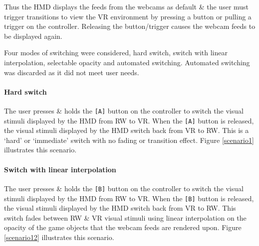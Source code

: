 \documentclass[conference]{acmsiggraph}
\begin{document}

Thus the HMD displays the feeds from the webcams as default \& the user must trigger transitions to view the VR environment by pressing a button or pulling a trigger on the controller. Releasing the button/trigger causes the webcam feeds to be displayed again.

Four modes of switching were considered, hard switch, switch with linear interpolation, selectable opacity and automated switching. Automated switching was discarded as it did not meet user needs. 

\paragraph{Hard switch}
\label{sub-hardswitch}
The user presses \& holds the \texttt{[A]} button on the controller to switch the visual stimuli displayed by the HMD from RW to VR. When the \texttt{[A]} button is released, the visual stimuli displayed by the HMD switch back from VR to RW. This is a `hard' or `immediate' switch with no fading or transition effect. Figure \ref{scenario1} illustrates this scenario.

\paragraph{Switch with linear interpolation}
The user presses \& holds the \texttt{[B]} button on the controller to switch the visual stimuli displayed by the HMD from RW to VR. When the \texttt{[B]} button is released, the visual stimuli displayed by the HMD switch back from VR to RW. This switch fades between RW \& VR  visual stimuli using linear interpolation on the opacity of the game objects that the webcam feeds are rendered upon. Figure \ref{scenario12} illustrates this scenario.
\end{document}

